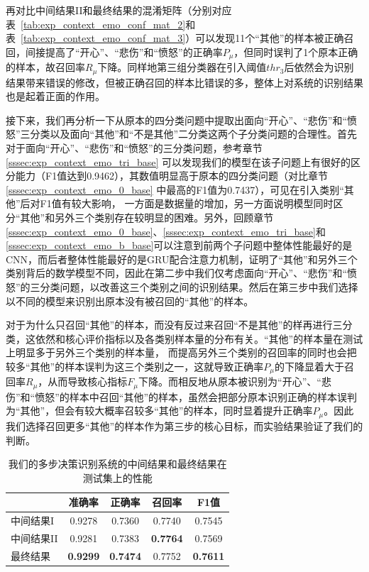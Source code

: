 再对比中间结果II和最终结果的混淆矩阵（分别对应表~\ref{tab:exp_context_emo_conf_mat_2}和表~\ref{tab:exp_context_emo_conf_mat_3}）可以发现11个“其他”的样本被正确召回，间接提高了“开心”、“悲伤”和“愤怒”的正确率$P_\mu$，但同时误判了1个原本正确的样本，故召回率$R_\mu$下降。同样地第三组分类器在引入阈值$thr_3$后依然会为识别结果带来错误的修改，但被正确召回的样本比错误的多，整体上对系统的识别结果也是起着正面的作用。

接下来，我们再分析一下从原本的四分类问题中提取出面向“开心”、“悲伤”和“愤怒”三分类以及面向“其他”和“不是其他”二分类这两个子分类问题的合理性。首先对于面向“开心”、“悲伤”和“愤怒”的三分类问题，参考章节\ref{sssec:exp_context_emo_tri_base}
可以发现我们的模型在该子问题上有很好的区分能力（F1值达到0.9462），其数值明显高于原本的四分类问题（对比章节\ref{sssec:exp_context_emo_0_base}
中最高的F1值为0.7437），可见在引入类别“其他”后对F1值有较大影响，
一方面是数据量的增加，另一方面说明模型同时区分“其他”和另外三个类别存在较明显的困难。另外，回顾章节\ref{sssec:exp_context_emo_0_base}、\ref{sssec:exp_context_emo_tri_base}和\ref{sssec:exp_context_emo_b_base}可以注意到前两个子问题中整体性能最好的是CNN，而后者整体性能最好的是GRU配合注意力机制，证明了“其他”和另外三个类别背后的数学模型不同，因此在第二步中我们仅考虑面向“开心”、“悲伤”和“愤怒”的三分类问题，以改善这三个类别之间的识别结果。然后在第三步中我们选择以不同的模型来识别出原本没有被召回的“其他”的样本。

对于为什么只召回“其他”的样本，而没有反过来召回“不是其他”的样再进行三分类，这依然和核心评价指标以及各类别样本量的分布有关。“其他”的样本量在测试上明显多于另外三个类别的样本量，
而提高另外三个类别的召回率的同时也会把较多“其他”的样本误判为这三个类别之一，这就导致正确率$P_\mu$的下降显着大于召回率$R_\mu$，从而导致核心指标$F_\mu$下降。而相反地从原本被识别为“开心”、“悲伤”和“愤怒”的样本中召回“其他”的样本，虽然会把部分原本识别正确的样本误判为“其他”，但会有较大概率召较多“其他”的样本，同时显着提升正确率$P_\mu$。因此我们选择召回更多“其他”的样本作为第三步的核心目标，而实验结果验证了我们的判断。

\begin{table}[htb]
  \centering
  \begin{minipage}[t]{0.6\linewidth}
  \caption{我们的多步决策识别系统的中间结果和最终结果在测试集上的性能}
  \label{tab:exp_context_emo_ensemble_result}
    \begin{tabularx}{\linewidth}{X|cccc}
    \toprule[1.5pt]
    & 准确率 & 正确率 & 召回率 & F1值 \\
    \hline
    中间结果I & 0.9278 & 0.7360 & 0.7740 & 0.7545 \\
    中间结果II & 0.9281 & 0.7383 & \bf 0.7764 & 0.7569 \\
    \hline
    最终结果 & \bf 0.9299 & \bf 0.7474 & 0.7752 & \bf 0.7611 \\ 
    \bottomrule[1.5pt]
    \end{tabularx}
  \end{minipage}
\end{table}

